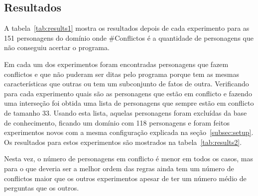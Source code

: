 \subsection{Resultados}
\label{subsec:results}

A tabela~\ref{tab:results1} mostra os resultados depois de cada experimento para as 151 personagens do domínio onde \#Conflictos é a quantidade de personagens que não conseguiu acertar o programa.

\begin{table}[ h ]
	\centering
	\caption{Resultados dos experimentos}
	\label{tab:results1}
\end{table}

Em cada um dos experimentos foram encontradas personagens que fazem conflictos e que não puderam ser ditas pelo programa porque tem as mesmas características que outras ou tem um subconjunto de fatos de outra. Verificando para cada experimento quais são as personagens que estão em conflicto e fazendo uma interseção foi obtida uma lista de personagens que sempre estão em conflicto de tamanho 33. Usando esta lista, aquelas personagens foram excluídas da base de conhecimento, ficando um domínio com 118 personagens e foram feitos experimentos novos com a mesma configuração explicada na seção~\ref{subsec:setup}. Os resultados para estos experimentos são mostrados na tabela~\ref{tab:results2}.

\begin{table}[ h ]
	\centering
	\caption{Resultados dos experimentos com 118 personagens}
	\label{tab:results2}
\end{table}

Nesta vez, o número de personagens em conflicto é menor em todos os casos, mas para o que deveria ser a melhor ordem das regras ainda tem um número de conflictos maior que os outros experimentos apesar de ter um número médio de perguntas que os outros.
